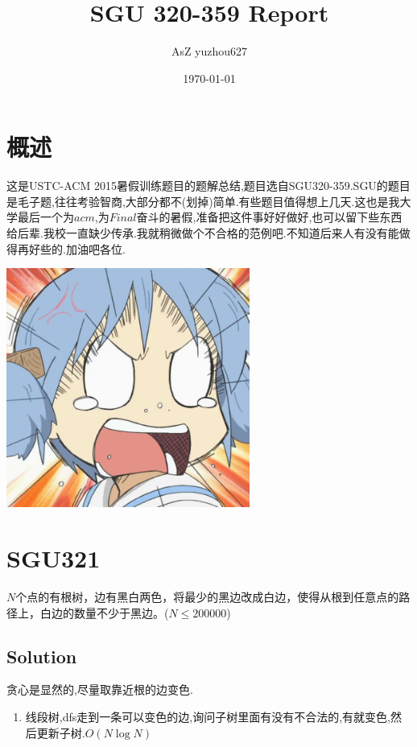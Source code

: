 \documentclass{article}
\begin{document}
 
\begin{flushleft}

\title{SGU 320-359 Report}
\author{AsZ yuzhou627}
\date{\today}
\maketitle

\setcounter{tocdepth}{3}
\tableofcontents

\section{概述}
这是USTC-ACM 2015暑假训练题目的题解总结,题目选自SGU320-359.SGU的题目是毛子题,往往考验智商,大部分都不(划掉)简单.有些题目值得想上几天.这也是我大学最后一个为$acm$,为$Final$奋斗的暑假,准备把这件事好好做好,也可以留下些东西给后辈.我校一直缺少传承.我就稍微做个不合格的范例吧.不知道后来人有没有能做得再好些的.加油吧各位.

\begin{center}
\includegraphics[width = 0.6\textwidth]{mio}
\end{center}

\section{SGU321}
$N$个点的有根树，边有黑白两色，将最少的黑边改成白边，使得从根到任意点的路径上，白边的数量不少于黑边。($N \leq 200000$)\\

\subsection{Solution}
贪心是显然的,尽量取靠近根的边变色.
\begin{enumerate}
\item 线段树,dfs走到一条可以变色的边,询问子树里面有没有不合法的,有就变色,然后更新子树.$O(N\log{N})$\\


\end{enumerate}
\end{flushleft}
\end{document}
